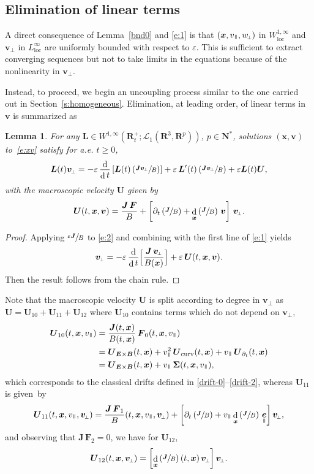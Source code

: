 \documentclass[10pt]{amsart}
\let\mathcal\mathscr
\newcommand{\sperp}{{\scriptscriptstyle\perp}}
\let\eps\varepsilon
\let\d\partial
\DeclareMathOperator\dD{d}\let\dd\dD
\theoremstyle{plain}
\newtheorem{lemma}[theorem]{Lemma}
\theoremstyle{definition}
\newcommand{\be}{\begin{equation}}
\newcommand{\ee}{\end{equation}}
\newcommand{\bl}{\begin{lemma}}
\newcommand{\el}{\end{lemma}}
\newcommand\R{\mathbf R}
\newcommand{\N}{\mathbf N}
\newcommand\bB{{\boldsymbol B}}
\newcommand\bE{{\boldsymbol E}}
\newcommand\bF{{\boldsymbol F}}
\newcommand\bJ{{\boldsymbol J}}
\newcommand\bL{{\boldsymbol L}}
\newcommand\bU{{\boldsymbol U}}
\newcommand\bfv{{\boldsymbol v}}
\newcommand\bfx{{\boldsymbol x}}
\newcommand\Sig{{\boldsymbol \Sigma}}
\newcommand\cL{{\mathcal L}}
\DeclareMathOperator{\beD}{\boldsymbol{e}}
\newcommand\eDpar{\beD_\mypar}
\newcommand\vpar{v_\mypar}
\newcommand\bvperp{\bfv_{\!\sperp}}
\newcommand\eperp{w_{\!\sperp}}
\newcommand{\EcB}{\bU_{\bE\times\bB}}
\newcommand{\curvB}{\bU_{\mathrm{curv}}}
\newcommand{\dtB}{\bU_{\d_t}}
\newcommand{\mypar}{{\mkern3mu\vphantom{\perp}\vrule depth 0pt\mkern2mu\vrule depth 0pt\mkern3mu}}
\begin{document}
\subsection{Elimination of linear terms}

A direct consequence of Lemma~\ref{bnd0} and \eqref{e:1} is that $(\bfx,\vpar,\eperp)$ in $W^{1,\infty}_\mathrm{loc}$ and $\bvperp$ in $L_\mathrm{loc}^\infty$ are uniformly bounded with respect to $\eps$. This is sufficient to extract converging sequences but not to take limits in the equations because of the nonlinearity in $\bvperp$.

Instead, to proceed, we begin an uncoupling process similar to the one carried out in Section~\ref{s:homogeneous}. Elimination, at leading order, of linear terms in $\bfv$ is summarized as

\bl
\label{1st}
For any $\bL\in W^{1,\infty}(\R^+_t;\cL_1(\R^3,\R^p))$, $p\in\N^*$,
solutions $(\bfx,\bfv)$ to~\eqref{e:xv} satisfy for a.e. $t\geq 0$,
\[
\bL(t)\bvperp =-\eps\,\frac{\dD}{\dD t}\left[\bL(t)\left(\sfrac{\bJ\bvperp}{B}\right)\right]
+\eps\, \bL'(t)\left(\sfrac{\bJ\bvperp}{B}\right)
+\eps \bL(t)\bU,
\]
with the macroscopic velocity $\bU$ given by
\be
\label{U}
\bU(t,\bfx,\bfv)= \frac{\bJ\,\bF}{B}
+\left[\d_t\left(\sfrac{\bJ}{B}\right)
+\dD_\bfx\left(\sfrac{\bJ}{B}\right)\,\bfv\right]\,\bvperp.
\ee
\el

\begin{proof}
Applying $\sfrac{\eps\bJ}{B}$ to \eqref{e:2} and combining with the first line of \eqref{e:1} yields
\be\label{e:homologic-1st}
\bvperp =-\eps\,\frac{\dD}{\dD t}\Bigl[\frac{\bJ\,\bvperp}{B(\bfx)}\Bigr]
+\eps\, \bU(t,\bfx,\bfv).
\ee
Then the result follows from the chain rule.
\end{proof}

Note that the macroscopic velocity $\bU$ is split according to degree
in $\bvperp$ as $\bU=\bU_{10}+\bU_{11}+\bU_{12}$ where $\bU_{10}$
contains terms which do not depend on $\bvperp$,
\begin{align*}
\bU_{10}(t,\bfx,\vpar) &=
\frac{\bJ(t,\bfx)}{B(t,\bfx)}\,\bF_{0}(t,\bfx,\vpar)
\\
&= \EcB(t,\bfx)+\vpar^2\,\curvB(t,\bfx) +\vpar\,\dtB(t,\bfx)
\\
&= \EcB(t,\bfx)+\vpar\,\Sig(t,\bfx,\vpar),
\end{align*}
which corresponds to the classical drifts defined in \eqref{drift-0}--\eqref{drift-2}, whereas $\bU_{11}$ is given~by
\[
\bU_{11}(t,\bfx,\vpar,\bvperp)
= \frac{\bJ\,\bF_1}{B}(t,\bfx,\vpar,\bvperp)
+\left[\d_t\left(\sfrac{\bJ}{B}\right) +\vpar\dD_\bfx\left(\sfrac{\bJ}{B}\right)\,\eDpar\right]\bvperp,
\]
and observing that $\bJ\,\bF_2=0$, we have for $\bU_{12}$,
\[
\bU_{12}(t,\bfx,\bvperp)
=\left[\dD_\bfx\left(\sfrac{\bJ}{B}\right)(t,\bfx)\,\bvperp\right]\bvperp.
\]
\end{document}
